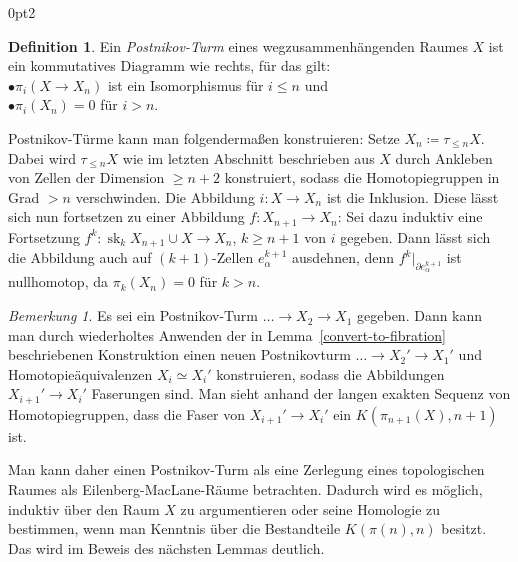 \documentclass[11pt, a4paper, german]{article}
\theoremstyle{definition}
\newtheorem{defn}[lem]{Definition}
\theoremstyle{remark}
\newtheorem*{bem}{Bemerkung}
\newcommand{\trunc}[2]{\tau_{#1} #2} %
\DeclareMathOperator{\sk}{sk} %
\newenvironment{centertikzcd}
  {\begin{center}\begin{tikzcd}}
  {\end{tikzcd}\end{center}}
\begin{document}
\renewcommand\windowpagestuff{
  \vspace{1cm}
  \begin{centertikzcd}[ampersand replacement=\&, column sep=0.2cm, row sep=0.5cm]
    \&\&\& X \arrow[dll] \arrow[dl] \arrow[d] \\
    \dots \arrow[r] \&
    X_3 \arrow[r] \&
    X_2 \arrow[r] \&
    X_1
  \end{centertikzcd}
}
\opencutright
\begin{cutout}{0}{\dimexpr\linewidth-4.5cm\relax}{0pt}{2}
  \begin{defn}
    Ein \emph{Postnikov-Turm} eines wegzusammenhängenden Raumes $X$ ist ein kommutatives Diagramm wie rechts, für das gilt: \\[3pt]
    \quad$\bullet$\enspace $\pi_i(X \to X_n)$ ist ein Isomorphismus für $i \leq n$ und \\
    \quad$\bullet$\enspace $\pi_i(X_n) = 0$ für $i > n$.
  \end{defn}
\end{cutout}

Postnikov-Türme kann man folgendermaßen konstruieren:
Setze $X_n \coloneqq \trunc{\leq n}{X}$.
Dabei wird $\trunc{\leq n}{X}$ wie im letzten Abschnitt beschrieben aus $X$ durch Ankleben von Zellen der Dimension $\geq n+2$ konstruiert, sodass die Homotopiegruppen in Grad $> n$ verschwinden.
Die Abbildung $i : X \to X_n$ ist die Inklusion.
Diese lässt sich nun fortsetzen zu einer Abbildung $f : X_{n+1} \to X_n$:
Sei dazu induktiv eine Fortsetzung $f^k : \sk_k X_{n+1} \cup X \to X_n$, $k \geq n+1$ von $i$ gegeben.
Dann lässt sich die Abbildung auch auf $(k{+}1)$-Zellen $e^{k+1}_\alpha$ ausdehnen, denn $f^k|_{\partial e^{k+1}_\alpha}$ ist nullhomotop, da $\pi_k(X_n) = 0$ für $k > n$.

\begin{bem}
  Es sei ein Postnikov-Turm $\ldots \to X_2 \to X_1$ gegeben.
  Dann kann man durch wiederholtes Anwenden der in Lemma~\ref{convert-to-fibration} beschriebenen Konstruktion einen neuen Postnikovturm $\ldots \to X_2' \to X_1'$ und Homotopieäquivalenzen $X_i \simeq X_i'$ konstruieren, sodass die Abbildungen $X_{i+1}' \to X_i'$ Faserungen sind.
  Man sieht anhand der langen exakten Sequenz von Homotopiegruppen, dass die Faser von $X_{i+1}' \to X_i'$ ein $K(\pi_{n+1}(X), n{+}1)$ ist.
\end{bem}

Man kann daher einen Postnikov-Turm als eine Zerlegung eines topologischen Raumes als Eilenberg-MacLane-Räume betrachten.
Dadurch wird es möglich, induktiv über den Raum $X$ zu argumentieren oder seine Homologie zu bestimmen, wenn man Kenntnis über die Bestandteile $K(\pi(n), n)$ besitzt.
Das wird im Beweis des nächsten Lemmas deutlich.
\end{document}
